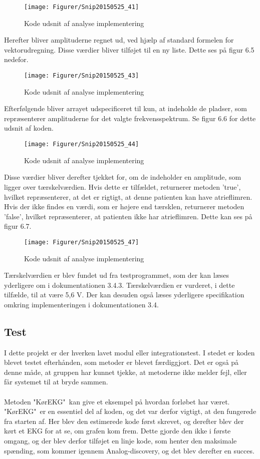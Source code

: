 \begin{figure}[H]
	\centering
	\texttt{[image: Figurer/Snip20150525\_41]}
	\caption{Kode udsnit af analyse implementering}
\end{figure}

Herefter bliver amplituderne regnet ud, ved hjælp af standard formelen for vektorudregning. Disse værdier bliver tilføjet til en ny liste. Dette ses på figur 6.5 nedefor.

\begin{figure}[H]
	\centering
	\texttt{[image: Figurer/Snip20150525\_43]}
	\caption{Kode udsnit af analyse implementering}
\end{figure}

Efterfølgende bliver arrayet udspecificeret til kun, at indeholde de pladser, som repræsenterer amplituderne for det valgte frekvensspektrum. Se figur 6.6 for dette udsnit af koden.  

\begin{figure}[H]
	\centering
	\texttt{[image: Figurer/Snip20150525\_44]}
	\caption{Kode udsnit af analyse implementering}
\end{figure}

Disse værdier bliver derefter tjekket for, om de indeholder en amplitude, som ligger over tærskelværdien. Hvis dette er tilfældet, returnerer metoden ’true’, hvilket repræsenterer, at det er rigtigt, at denne patienten kan have atrieflimren. Hvis der ikke findes en værdi, som er højere end tærsklen, returnerer metoden ’false’, hvilket repræsenterer, at patienten ikke har atrieflimren. Dette kan ses på figur 6.7. 

\begin{figure}[H]
	\centering
	\texttt{[image: Figurer/Snip20150525\_47]}
	\caption{Kode udsnit af analyse implementering}
\end{figure}

Tærskelværdien er blev fundet ud fra testprogrammet, som der kan læses yderligere om i dokumentationen 3.4.3. Tærskelværdien er vurderet, i dette tilfælde, til at være 5,6 V. Der kan desuden også læses yderligere specifikation omkring implementeringen i dokumentationen 3.4. 


\subsection{Test}
I dette projekt er der hverken lavet modul eller integrationstest. I stedet er koden blevet testet efterhånden, som metoder er blevet færdiggjort. Det er også på denne måde, at gruppen har kunnet tjekke, at metoderne ikke melder fejl, eller får systemet til at bryde sammen. \\ \\
Metoden "KørEKG"\  kan give et eksempel på hvordan forløbet har været. "KørEKG"\  er en essentiel del af koden, og det var derfor vigtigt, at den fungerede fra starten af. Her blev den estimerede kode først skrevet, og derefter blev der kørt et EKG for at se, om grafen kom frem. Dette gjorde den ikke i første omgang, og der blev derfor tilføjet en linje kode, som henter den maksimale spænding, som kommer igennem Analog-discovery, og det blev derefter en succes. 

